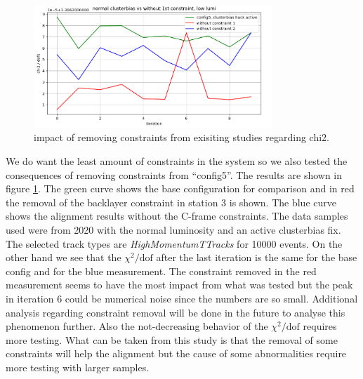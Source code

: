 \begin{figure}
  \centering
  \includegraphics[width=0.8\textwidth]{plots/feb_6_2022/low_lumi_removed_constraints_vs_normal.png}
  \caption{impact of removing constraints from exisiting studies regarding chi2.}
  \label{fig:removeConst}
\end{figure}

We do want the least amount of constraints in the system so we also tested
the consequences of removing constraints from ``config5''.
The results are shown in figure \ref{fig:removeConst}.
The green curve shows the base configuration for comparison and in red the removal of the backlayer constraint in station 3 is shown. The blue curve shows the alignment results without the C-frame constraints.
The data samples used were from 2020 with the normal luminosity and an active clusterbias fix.
The selected track types are \textit{HighMomentumTTracks} for 10000 events.
On the other hand we see that the $\chi^2 / \text{dof}$ after the last iteration is the same for the base config and for the blue measurement. The constraint removed in the red measurement seems to have the most impact from what was tested but the peak in iteration 6 could be numerical noise since the numbers are so small. Additional analysis regarding constraint removal will be done in the future to analyse this phenomenon further.
Also the not-decreasing behavior of the  $\chi^2 / \text{dof}$ requires more testing.
What can be taken from this study is that the removal of some constraints will help
the alignment but the cause of some abnormalities require more testing with larger samples.
